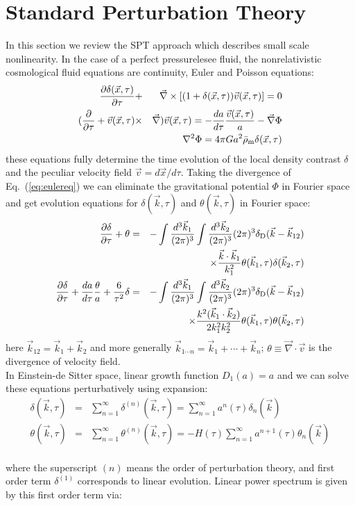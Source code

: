 \documentclass[prd,amsmath,amssymb,floatfix,superscriptaddress,nofootinbib,twocolumn]{revtex4-1}
\def\bea{\begin{eqnarray}}
\def\eea{\end{eqnarray}}
\newcommand{\vs}{\nonumber\\}
\newcommand{\vk}{\vec{k}}
\newcommand{\ec}[1]{Eq.~(\ref{eq:#1})}
\newcommand{\eql}[1]{\label{eq:#1}}
\begin{document}
\section{Standard Perturbation Theory}\label{sec1}
In this section we review the SPT approach which describes small scale nonlinearity. In the case of a perfect pressurelesee fluid, the nonrelativistic cosmological fluid equations are continuity, Euler and Poisson equations:
\bea
\frac{\partial \delta(\vec{x},\tau)}{\partial \tau} &+&\vec{\nabla}\times [(1+\delta(\vec{x},\tau))\vec{v}(\vec{x},\tau)] =0 \\
(\frac{\partial}{\partial \tau} +\vec{v}(\vec{x},\tau)&\times&\vec{\nabla})\vec{v}(\vec{x},\tau)=-\frac{da}{d\tau}\frac{\vec{v}(\vec{x},\tau)}{a}-\vec{\nabla}\Phi \eql{eulereq}\\
&&\nabla^2 \Phi = 4\pi G a^2 \bar{\rho}_{\rm m} \delta(\vec{x},\tau) 
\eea
these equations fully determine the time evolution of the local density contrast $\delta$ and the peculiar velocity field $\vec{v}=d\vec{x}/d\tau$. Taking the divergence of \ec{eulereq} we can eliminate the gravitational potential $\Phi$ in Fourier space and get evolution equations for $\delta(\vk,\tau)$ and $\theta(\vk,\tau)$ in Fourier space:
\bea 
\frac{\partial{\delta}}{\partial\tau} + {\theta} &=& -\int \frac{d^{3}\vk_{1}}{(2\pi)^3} \int \frac{d^{3}\vk_{2}}{(2\pi)^3} (2\pi)^3 \delta_{\rm D}(\vk-\vk_{12}) \vs
&& \times\frac{\vk \cdot \vk_1}{k_1^2}{\theta}(\vk_1,\tau){\delta}(\vk_2,\tau) \eql{fouriercont}\\
\frac{\partial{\delta}}{\partial\tau}+\frac{da}{d\tau}\frac{{\theta}}{a}+\frac{6}{\tau^2}{\delta}&=&-\int \frac{d^{3}\vk_{1}}{(2\pi)^3} \int \frac{d^{3}\vk_{2}}{(2\pi)^3} (2\pi)^3 \delta_{\rm D}(\vk-\vk_{12})\vs
&&\times \frac{k^2(\vk_1 \cdot \vk_2)}{2k_1^2 k_2^2} {\theta}(\vk_1,\tau){\theta}(\vk_2,\tau) \eql{fouriereuler}
\eea
here $\vk_{12}=\vk_1 +\vk_2$ and more generally $\vk_{1\cdots n}=\vk_1 + \cdots +\vk_n$; $\theta\equiv \vec{\nabla}\cdot \vec{v}$ is the divergence of velocity field.\\
In Einstein-de Sitter space, linear growth function $D_{1}(a)=a$ and we can solve these equations perturbatively using expansion:
\bea
{\delta}(\vk,\tau)&=&\sum_{n=1}^{\infty} {\delta}^{(n)}(\vk,\tau)=\sum_{n=1}^{\infty}a^{n}(\tau)\delta_{n}(\vk) \\ {\theta}(\vk,\tau)&=&\sum_{n=1}^{\infty}{\theta}^{(n)}(\vk,\tau)=-H(\tau)\sum_{n=1}^{\infty}a^{n+1}(\tau)\theta_{n}(\vk) 
\eea
\\where the superscript $(n)$ means the order of perturbation theory, and first order term ${\delta}^{(1)}$ corresponds to linear evolution. Linear power spectrum is given by this first order term via:
\end{document}
